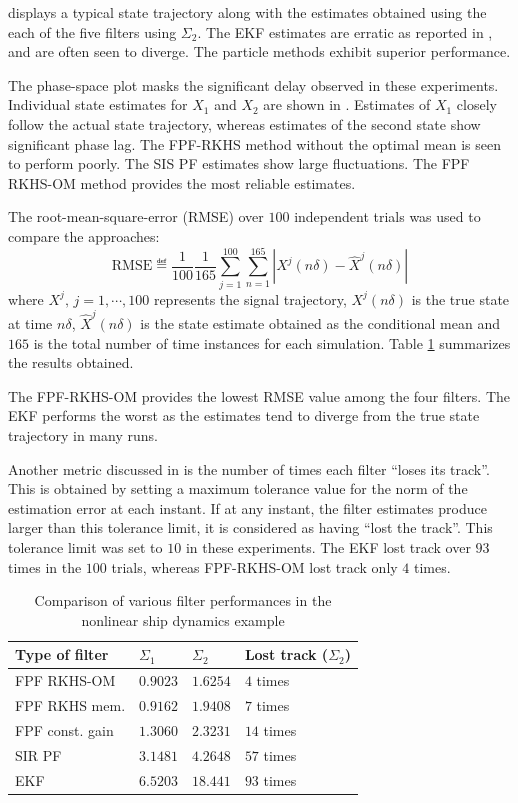  displays a typical state trajectory along with the estimates obtained using the each of the five filters using  $\Sigma_2$. The EKF estimates are erratic as reported in \cite{budchelee07}, and are often seen to diverge. The particle methods exhibit superior performance.

The phase-space plot masks the significant delay observed in these experiments.   Individual state estimates for $X_{1}$ and $X_2$ are shown in .
Estimates of $X_1$ closely follow the actual state trajectory, whereas estimates of the second state  show  significant phase lag. The FPF-RKHS method without the optimal mean is seen to perform poorly. The SIS PF estimates show large fluctuations.
The FPF RKHS-OM method provides the most reliable estimates.

The root-mean-square-error (RMSE) over $100$ independent trials was used to compare the approaches:
\[
\text{RMSE} \eqdef \frac{1}{100} \frac{1}{165} \sum_{j=1}^{100}\sum_{n=1}^{165} | X^j(n \delta) - \hat{X}^j(n \delta) |
\]
where $X^j, \, j= 1 ,\cdots, 100$ represents the signal trajectory, $X^j(n\delta)$ is the true state at time $n\delta$, $\hat{X}^j(n\delta)$ is the state estimate obtained as the conditional mean and $165$ is the total number of time instances for each simulation. Table \ref{table:fpf_rmse} summarizes the results obtained.

The FPF-RKHS-OM provides the lowest RMSE value among the four filters. The EKF performs the worst as the estimates tend to diverge from the true state trajectory in many runs.

Another metric discussed in \cite{budchelee07} is the number of times each filter ``loses its track''. This is obtained by setting a maximum tolerance value for the norm of the estimation error at each instant. If at any instant, the filter estimates produce larger than this tolerance limit, it is considered as having ``lost the track''.   This tolerance limit was set to $10$ in these experiments. The EKF lost track over $93$ times in the $100$ trials, whereas FPF-RKHS-OM lost track only $4$ times.\
\begin{table}[htbp]
	\caption{Comparison of various filter performances in the nonlinear ship dynamics example}
		\begin{tabularx}{6.5in}{ XXXX }
			\hline
			Type of filter & $\Sigma_1$ & $\Sigma_2$ & Lost track ($\Sigma_2$) \\
			\hline
			FPF RKHS-OM & $0.9023$  &  $1.6254$ & $4$ times\\
			FPF RKHS mem. &$0.9162$ &  $ 1.9408$ & $ 7 $ times\\
			FPF const. gain & $1.3060$ & $2.3231$ & $14$ times \\
			SIR PF & $3.1481$  &  $4.2648$ &  $57$ times \\
			EKF &  $6.5203$ & $18.441$ & $93$ times \\ 		
			\hline
		\end{tabularx}
		\label{table:fpf_rmse}
\end{table}

